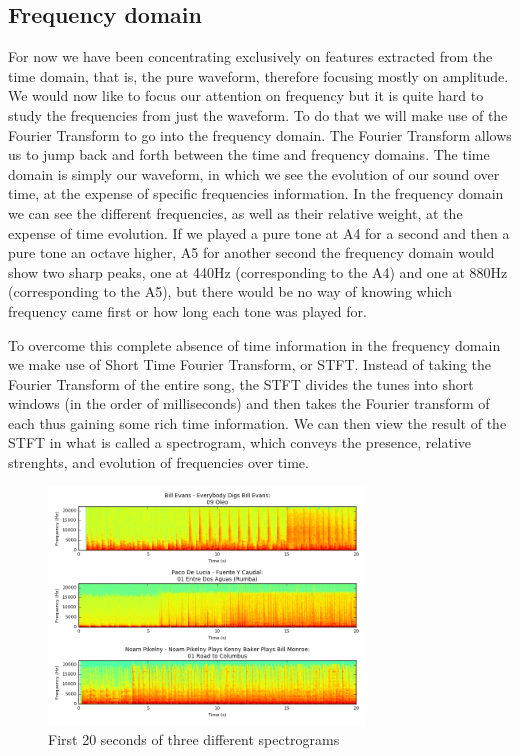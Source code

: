 \documentclass[12pt]{article}
\begin{document}
\subsection*{Frequency domain}
For now we have been concentrating exclusively on features extracted from the time domain, that is, the pure waveform, therefore focusing mostly on amplitude. We would now like to focus our attention on frequency but it is quite hard to study the frequencies from just the waveform. To do that we will make use of the Fourier Transform to go into the frequency domain. The Fourier Transform allows us to jump back and forth between the time and frequency domains. The time domain is simply our waveform, in which we see the evolution of our sound over time, at the expense of specific frequencies information. In the frequency domain we can see the different frequencies, as well as their relative weight, at the expense of time evolution. If we played a pure tone at A4 for a second and then a pure tone an octave higher, A5 for another second the frequency domain would show two sharp peaks, one at 440Hz (corresponding to the A4) and one at 880Hz (corresponding to the A5), but there would be no way of knowing which frequency came first or how long each tone was played for.

To overcome this complete absence of time information in the frequency domain we make use of Short Time Fourier Transform, or STFT. Instead of taking the Fourier Transform of the entire song, the STFT divides the tunes into short windows (in the order of milliseconds) and then takes the Fourier transform of each thus gaining some rich time information. We can then view the result of the STFT in what is called a spectrogram, which conveys the presence, relative strenghts, and evolution of frequencies over time.

\begin{figure}
\centering
  \includegraphics[width=0.75\textwidth]{spectrograms.png}
  \caption{First 20 seconds of three different spectrograms}
  \label{spectrograms}
\end{figure}
 
\end{document}
